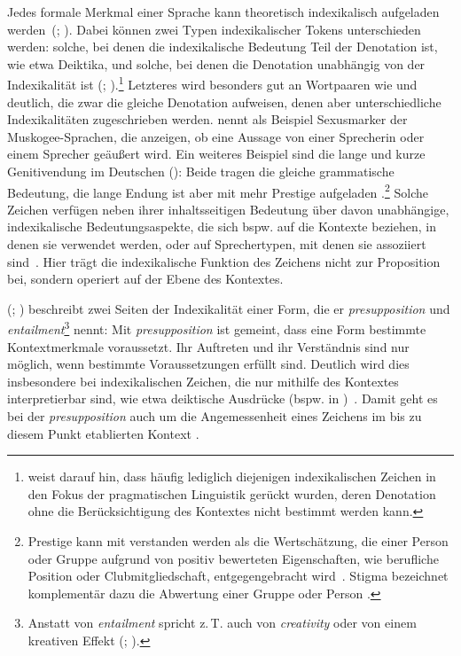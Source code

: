 Jedes formale Merkmal einer Sprache kann theoretisch indexikalisch aufgeladen werden~(\citealp[s.][42]{Silverstein.1976}; \citeyear[206]{Silverstein1979}). 
Dabei können zwei Typen indexikalischer Tokens unterschieden werden: solche, bei denen die indexikalische Bedeutung Teil der Denotation ist, wie etwa Deiktika, und solche, bei denen die Denotation unabhängig von der Indexikalität ist (\citealp[s.][34]{Silverstein.1976}; \citealp[497]{HessLuttich2005}).\footnote{\citet[3]{Auer.1995} weist darauf hin, dass häufig lediglich diejenigen indexikalischen Zeichen in den Fokus der pragmatischen Linguistik gerückt wurden, deren Denotation ohne die Berücksichtigung des Kontextes nicht bestimmt werden kann.}
Letzteres wird besonders gut an Wortpaaren wie  und  deutlich, die zwar die gleiche Denotation aufweisen, denen aber unterschiedliche Indexikalitäten zugeschrieben werden. 
\citet[30--31]{Silverstein.1976} nennt als Beispiel Sexusmarker der Muskogee-Sprachen, die anzeigen, ob eine Aussage von einer Sprecherin oder einem Sprecher ge{\"a}u{\ss}ert wird.
Ein weiteres Beispiel sind die lange und kurze Genitivendung im Deutschen (): Beide tragen die gleiche grammatische Bedeutung, die lange Endung ist aber mit mehr Prestige aufgeladen \citep[s.][]{Szczepaniak2014}.\footnote{Prestige kann mit \citet{Strasser2005} verstanden werden als {\glqq}die Wertschätzung, die einer Person oder Gruppe aufgrund von positiv bewerteten Eigenschaften, wie berufliche Position oder Clubmitgliedschaft, entgegengebracht wird{\grqq}~\citep[412]{Strasser2005}. Stigma bezeichnet komplementär dazu die Abwertung einer Gruppe oder Person \citep[s.][412]{Strasser2005}.}
Solche Zeichen verfügen neben ihrer inhaltsseitigen Bedeutung über davon unabhängige, indexikalische Bedeutungsaspekte, die sich bspw. auf die Kontexte beziehen, in denen sie verwendet werden, oder auf Sprechertypen, mit denen sie assoziiert sind~\citep[s.][206--207]{Silverstein1979}. 
Hier trägt die indexikalische Funktion des Zeichens nicht zur Proposition bei, sondern operiert auf der Ebene des Kontextes. 

\citeauthor{Silverstein.1976} (\citeyear[33--35]{Silverstein.1976}; \citeyear[195--196]{Silverstein2003}) beschreibt zwei Seiten der Indexikalität einer Form, die er \textit{presupposition} und \textit{entailment}\footnote{Anstatt von \textit{entailment} spricht \citeauthor{Silverstein1979} z.\,T. auch von \textit{creativity} oder von einem kreativen Effekt (\citealp[s.][]{Silverstein.1976}; \citeyear[]{Silverstein1979}).} nennt: 
Mit \textit{presupposition} ist gemeint, dass eine Form bestimmte Kontextmerkmale voraussetzt. 
Ihr Auftreten und ihr Verständnis sind nur möglich, wenn bestimmte Voraussetzungen erfüllt sind. 
Deutlich wird dies insbesondere bei indexikalischen Zeichen, die nur mithilfe des Kontextes interpretierbar sind, wie etwa deiktische Ausdr{\"u}cke (bspw.  in )~\citep[s.][33]{Silverstein.1976}. 
Damit geht es bei der \textit{presupposition} auch um die Angemessenheit eines Zeichens im bis zu diesem Punkt etablierten Kontext \citep[s.][195]{Silverstein2003}. 

